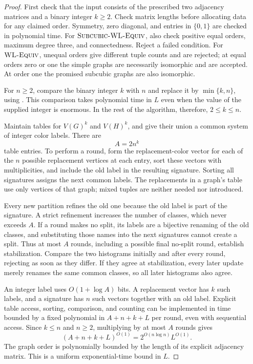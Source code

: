 \begin{proof}
First check that the input consists of the prescribed two adjacency matrices
and a binary integer $k\geq 2$.  Check matrix lengths before allocating data
for any claimed order.  Symmetry, zero diagonal, and entries in \(\{0,1\}\) are checked in
polynomial time. For \(\textnormal{\textsc{Subcubic-WL-Equiv}}\), also check positive equal orders,
maximum degree three, and connectedness. Reject a failed condition.
For \(\textnormal{\textsc{WL-Equiv}}\), unequal orders give different tuple counts and are
rejected; at equal orders zero or one the simple graphs are necessarily
isomorphic and are accepted. At order one the promised subcubic graphs
are also isomorphic.

For $n\geq 2$, compare the binary integer $k$ with $n$ and replace it by
$\min\{k,n\}$, using .  This comparison takes
polynomial time in $L$ even when the value of the supplied integer is
enormous.  In the rest of the algorithm, therefore, $2\leq k\leq n$.

Maintain tables for $V(G)^k$ and $V(H)^k$, and give their union a common
system of integer color labels.  There are
\[
 A=2n^k
\]
table entries.  To perform a round, form the replacement-color vector for
each of the $n$ possible replacement vertices at each entry, sort these
vectors with multiplicities, and include the old label in the resulting
signature.  Sorting all signatures assigns the next common labels.  The
replacements in a graph's table use only vertices of that graph; mixed
tuples are neither needed nor introduced.

Every new partition refines the old one because the old label is part of
the signature.  A strict refinement increases the number of classes, which
never exceeds $A$.  If a round makes no split, its labels are a bijective
renaming of the old classes, and substituting those names into the next
signatures cannot create a split.  Thus at most $A$ rounds, including a
possible final no-split round, establish stabilization.  Compare the two
histograms initially and after every round, rejecting as soon as they
differ.  If they agree at stabilization, every later update merely renames
the same common classes, so all later histograms also agree.

An integer label uses $O(1+\log A)$ bits.  A replacement vector has $k$
such labels, and a signature has $n$ such vectors together with an old
label.  Explicit table access, sorting, comparison, and counting can be
implemented in time bounded by a fixed polynomial in $A+n+k+L$ per round,
even with sequential access.  Since $k\leq n$ and $n\geq 2$, multiplying
by at most $A$ rounds gives
\[
 (A+n+k+L)^{O(1)}=2^{O(n\log n)}L^{O(1)}.
\]
The graph order is polynomially bounded by the length of its explicit
adjacency matrix.  This is a uniform exponential-time bound in $L$.
\end{proof}

